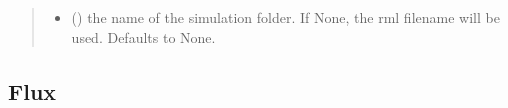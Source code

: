 \documentclass[letterpaper,10pt,english]{sphinxmanual}
\begin{document}
\begin{fulllineitems}
\begin{quote}
\begin{description}
\begin{itemize}
\item {} 
\sphinxAtStartPar
{} (\sphinxstyleliteralemphasis{\sphinxupquote{, }}) \textendash{} the name of the simulation folder. If None, the rml
filename will be used. Defaults to None.

\end{itemize}

\end{description}\end{quote}

\end{fulllineitems}



\subsection{Flux}
\label{\detokenize{API:flux}}
\end{document}
